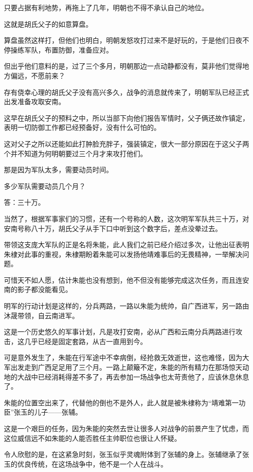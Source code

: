 \begin{multicols}{\theparacolNo}
只要占据有利地势，再拖上了几年，明朝也不得不承认自己的地位。

这就是胡氏父子的如意算盘。

算盘虽然这样打，但他们也明白，明朝发怒攻打过来不是好玩的，于是他们日夜不停操练军队，布置防御，准备应对。

但出乎他们意料的是，过了三个多月，明朝那边一点动静都没有，莫非他们觉得地方偏远，不愿前来？

存有侥幸心理的胡氏父子没有高兴多久，战争的消息就传来了，明朝军队已经正式出发准备攻取安南。

这早在胡氏父子的预料之中，所以当部下向他们报告军情时，父子俩还故作镇定，表明一切防御工作都已经预备好，没有什么可怕的。

这对父子之所以还能如此打肿脸充胖子，强装镇定，很大一部分原因在于这父子两个并不知道为何明朝要过三个月才来攻打他们。

那是因为军队太多，需要动员时间。

多少军队需要动员几个月？

答：三十万。

当然了，根据军事家们的习惯，还有一个号称的人数，这次明军军队共三十万，对安南号称八十万，胡氏父子从手下口中听到这个数字后，差点没晕过去。

带领这支庞大军队的正是名将朱能，此人我们之前已经介绍过多次，让他出征表明朱棣对此事的重视，朱棣期盼着朱能可以发扬他靖难事后的无畏精神，一举解决问题。

可惜天不如人愿，估计朱能也没有想到，他不但没有能够完成这次任务，而且连安南的影子都没能看见。

明军的行动计划是这样的，分兵两路，一路以朱能为统帅，自广西进军，另一路由沐晟带领，自云南进军。

这是一个历史悠久的军事计划，凡是攻打安南，必从广西和云南分兵两路进行攻击，这几乎已经是固定套路，从古一直用到今。

可是意外发生了，朱能在行军途中不幸病倒，经抢救无效逝世，这也难怪，因为大军出发走到广西足足用了三个月。一路上颠簸不定，朱能的所有精力在那场惊天动地的大战中已经消耗得差不多了，再去参加一场战争也太苛责他了，应该休息休息了。

朱能的位置空出来了，代替他的倒也不是外人，此人就是被朱棣称为“靖难第一功臣”张玉的儿子——张辅。

这是一个艰巨的任务，因为朱能的突然去世让很多人对战争的前景产生了忧虑，而这位威信远不如朱能的人能否胜任主帅职位也很让人怀疑。

令人欣慰的是，在这紧急时刻，张玉似乎灵魂附体到了张辅的身上。张辅继承了张玉的优良传统，在这场战争中，他不是一个人在战斗。


\end{multicols}
